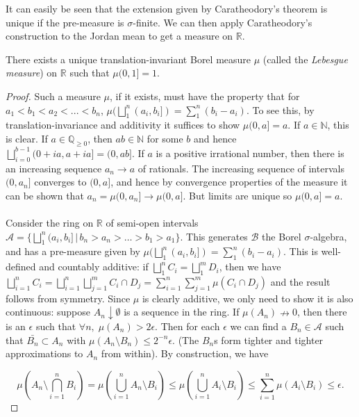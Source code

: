 \documentclass[9pt]{report}
\newlength{\tindent}
\newtheorem[L]{theorem}{Theorem}[chapter]
\newtheorem[L,nocut]{definition}[theorem]{Definition}
\newtheorem[S,nounderline]{remark}[theorem]{Remarks}
\newenvironment{Proof}{ 
	\\ \setlength{\parindent}{\tindent}
\begin{proof}}
{\end{proof} \setlength{\parindent}{0pt}}
\begin{document}
It can easily be seen that the extension given by Caratheodory's theorem is unique if the pre-measure is \(\sigma\)-finite. We can then apply Caratheodory's construction to the Jordan mean to get a measure on \(\mathbb{R}\).

\begin{theorem}
	There exists a unique translation-invariant Borel measure \(\mu\) (called the \emph{Lebesgue measure}) on \(\mathbb{R}\) such that \(\mu (0,1] = 1\). 
	\begin{Proof}
		Such a measure \(\mu\), if it exists, must have the property that for \(a_1<b_1<a_2<...<b_n\), \(\mu(\bigsqcup_1^n (a_i,b_i]) = \sum_1^n (b_i-a_i)\). To see this, by translation-invariance and additivity it suffices to show \(\mu (0,a] = a\). If \(a \in \mathbb{N}\), this is clear. If \(a \in \mathbb{Q}_{\geq 0}\), then \(a b \in \mathbb{N}\) for some \(b\) and hence \(\bigsqcup_{i=0}^{b-1}(0+i a,a + i a] = (0,a b]\). If \(a\) is a positive irrational number, then there is an increasing sequence \(a_n \rightarrow a\) of rationals. The increasing sequence of intervals \((0,a_n]\) converges to \((0,a]\), and hence by convergence properties of the measure it can be shown that \(a_n = \mu (0,a_n] \rightarrow \mu (0,a]\). But limits are unique so \(\mu(0,a]=a\). \\ \\ 
		Consider the ring on \(\mathbb{R}\) of semi-open intervals \(\mathcal{A}=\{\bigsqcup_1^n (a_i,b_i] \, |\, b_n>a_n>\dots>b_1>a_1 \}\). This generates \(\mathcal{B}\) the Borel \(\sigma\)-algebra, and has a pre-measure given by \(\mu(\bigsqcup_1^n (a_i,b_i]) = \sum_1^n(b_i-a_i)\). This is well-defined and countably additive: if \(\bigsqcup_1^n C_i = \bigsqcup_1^m D_i\), then we have \(\bigsqcup_{i=1}^n C_i = \bigsqcup_{i=1}^n \bigsqcup_{j=1}^m C_i\cap D_j = \sum_{i=1}^n \sum_{j=1}^m \mu(C_i\cap D_j)\) and the result follows from symmetry. Since \(\mu\) is clearly additive, we only need to show it is also continuous: suppose \(A_n \downarrow \emptyset\) is a sequence in the ring. If \(\mu(A_n)\nrightarrow 0\), then there is an \(\epsilon\) such that \(\forall n, \; \mu(A_n) > 2\epsilon\). Then for each \(\epsilon\) we can find a \(B_n \in \mathcal{A}\) such that \(\bar{B_n}\subset A_n\) with \(\mu(A_n \setminus B_n)\leq 2^{-n}\epsilon\). (The \(B_n\)s form tighter and tighter approximations to \(A_n\) from within). By construction, we have
  
         \[ \mu(A_n \setminus \bigcap_{i=1}^n B_i) = \mu(\bigcup_{i=1}^n A_n\setminus B_i) \leq \mu(\bigcup_{i=1}^n A_i\setminus B_i) \leq \sum_{i=1}^n\mu(A_i\setminus B_i) \leq \epsilon. \]


\end{Proof}
\end{theorem}
\end{document}
